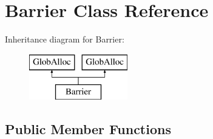 \hypertarget{classBarrier}{\section{Barrier Class Reference}
\label{classBarrier}
}
Inheritance diagram for Barrier\-:\begin{figure}[H]
\begin{center}
\leavevmode
\includegraphics[height=2.000000cm]{classBarrier}
\end{center}
\end{figure}
\subsection*{Public Member Functions}
